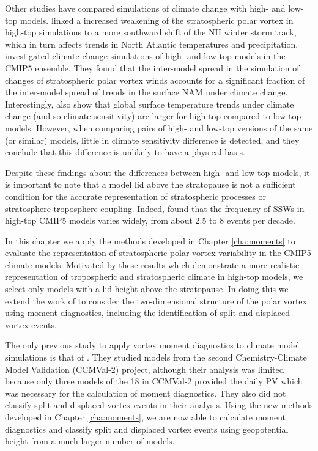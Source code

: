 Other studies have compared simulations of climate change with high- and low-top
models. \citet{Huebener2007} linked a increased weakening of the stratospheric
polar vortex in high-top simulations to a more southward shift of the NH winter
storm track, which in turn affects trends in North Atlantic temperatures and
precipitation. \citet{Manzini2014} investigated climate change simulations of
high- and low-top models in the CMIP5 ensemble. They found that the inter-model
spread in the simulation of changes of stratospheric polar vortex winds accounts
for a significant fraction of the inter-model spread of trends in the surface
NAM under climate change. Interestingly, \citet{Manzini2014} also show that
global surface temperature trends under climate change (and so climate
sensitivity) are larger for high-top compared to low-top models. However, when
comparing pairs of high- and low-top versions of the same (or similar) models,
little in climate sensitivity difference is detected, and they conclude that
this difference is unlikely to have a physical basis.

Despite these findings about the differences between high- and low-top models,
it is important to note that a model lid above the stratopause is not a
sufficient condition for the accurate representation of stratospheric processes
or stratosphere-troposphere coupling. Indeed, \citet{Charlton-Perez2013} found
that the frequency of SSWs in high-top CMIP5 models varies widely, from about
2.5 to 8 events per decade. 

In this chapter we apply the methods developed in Chapter \ref{cha:moments} to
evaluate the representation of stratospheric polar vortex variability in
the CMIP5 climate models. Motivated by these results which demonstrate a more
realistic representation of tropospheric and stratospheric climate in high-top
models, we select only models with a lid height above the stratopause. In doing
this we extend the work of \citet{Charlton-Perez2013} to consider the
two-dimensional structure of the polar vortex using moment diagnostics,
including the identification of split and displaced vortex events.

The only previous study to apply vortex moment diagnostics to climate model
simulations is that of \citet{Mitchell2012a}. They studied models from the
second Chemistry-Climate Model Validation (CCMVal-2) project, although their
analysis was limited because only three models of the 18 in CCMVal-2 provided
the daily PV which was necessary for the calculation of moment diagnostics. They
also did not classify split and displaced vortex events in their analysis. Using
the new methods developed in Chapter \ref{cha:moments}, we are now able to
calculate moment diagnostics and classify split and displaced vortex events
using geopotential height from a much larger number of models.

